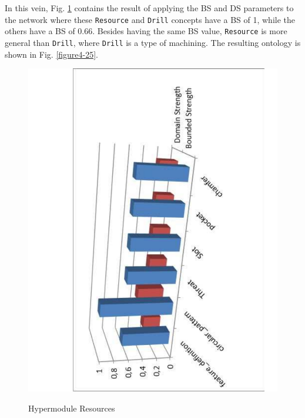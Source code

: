 In this vein, Fig. \ref{figure4-24} contains the result of applying the BS and DS parameters to the network where these \texttt{Resource} and \texttt{Drill} concepts have a BS of 1, while the others have a BS of 0.66. Besides having the same BS value, \texttt{Resource} is more general than \texttt{Drill}, where \texttt{Drill} is a type of machining. The resulting ontology is shown in Fig. \ref{figure4-25}.


\begin{figure}
\begin{center}
	\includegraphics[scale=0.5, angle=-90]{figure-chapterIV/fig4-24.pdf}\\
	\caption{Hypermodule Resources}
	\label{figure4-24}
\end{center}
\end{figure}

